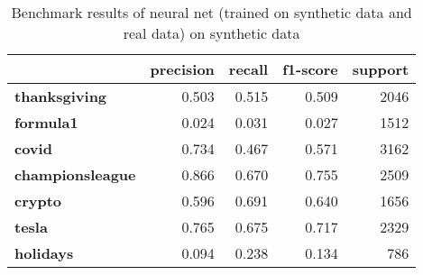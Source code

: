 \begin{table}
\centering
\caption{Benchmark results of neural net (trained on synthetic data and real data) on synthetic data}
\begin{tabular}{lrrrr}
\toprule
{} &  precision &  recall &  f1-score &  support \\
\midrule
\textbf{thanksgiving   } &      0.503 &   0.515 &     0.509 &     2046 \\
\textbf{formula1       } &      0.024 &   0.031 &     0.027 &     1512 \\
\textbf{covid          } &      0.734 &   0.467 &     0.571 &     3162 \\
\textbf{championsleague} &      0.866 &   0.670 &     0.755 &     2509 \\
\textbf{crypto         } &      0.596 &   0.691 &     0.640 &     1656 \\
\textbf{tesla          } &      0.765 &   0.675 &     0.717 &     2329 \\
\textbf{holidays       } &      0.094 &   0.238 &     0.134 &      786 \\
\bottomrule
\end{tabular}
\end{table}
